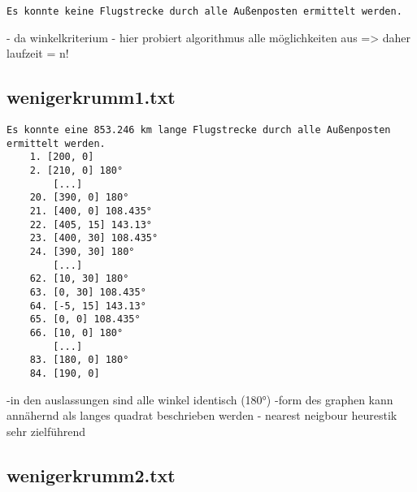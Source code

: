 \documentclass[a4paper,10pt,ngerman]{scrartcl}
\begin{document}
    \begin{lstlisting}[frame=single, title=Programmausgabe nicht\_loesbar.txt, breaklines=true,label={lst:lstlisting4}]
    Es konnte keine Flugstrecke durch alle Außenposten ermittelt werden.
    \end{lstlisting}

    - da winkelkriterium
    - hier probiert algorithmus alle möglichkeiten aus
    => daher laufzeit = n!

    \subsection{wenigerkrumm1.txt}\label{subsec:wenigerkrumm1.txt}

    \begin{lstlisting}[frame=single, title=Programmausgabe wenigerkrumm1.txt, breaklines=true,label={lst:lstlisting4}]
    Es konnte eine 853.246 km lange Flugstrecke durch alle Außenposten ermittelt werden.
    1. [200, 0]
    2. [210, 0] 180°
        [...]
    20. [390, 0] 180°
    21. [400, 0] 108.435°
    22. [405, 15] 143.13°
    23. [400, 30] 108.435°
    24. [390, 30] 180°
        [...]
    62. [10, 30] 180°
    63. [0, 30] 108.435°
    64. [-5, 15] 143.13°
    65. [0, 0] 108.435°
    66. [10, 0] 180°
        [...]
    83. [180, 0] 180°
    84. [190, 0]
    \end{lstlisting}

    -in den auslassungen sind alle winkel identisch (180°)
    -form des graphen kann annähernd als langes quadrat beschrieben werden
    - nearest neigbour heurestik sehr zielführend

    \subsection{wenigerkrumm2.txt}\label{subsec:wenigerkrumm2.txt}
\end{document}
